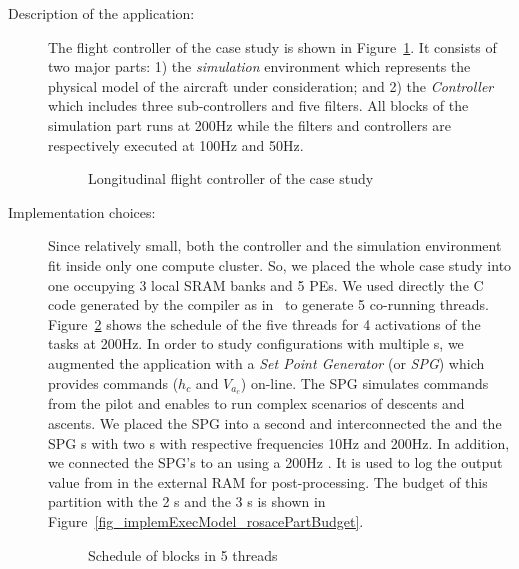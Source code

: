 \documentclass[main.tex]{subfiles}
\begin{document}
\begin{description}
    \item[Description of the application: ]
        The flight controller of the \rosace case study is shown in Figure~\ref{fig_implemExecModel_rosace}. It consists of two major parts: 1) the \emph{simulation} environment which represents the physical model of the aircraft under consideration; and 2) the \emph{Controller} which includes three sub-controllers and five filters. All blocks of the simulation part runs at 200Hz while the filters and controllers are respectively executed at 100Hz and 50Hz. 

            \begin{figure}
                \centering
                \scalebox{1.5}{}
                \caption{Longitudinal flight controller of the \rosace case study}
                \label{fig_implemExecModel_rosace}
            \end{figure}

        \item[Implementation choices: ] Since relatively small, both the \rosace controller and the simulation environment fit inside only one compute cluster. So, we placed the whole \rosace case study into one \PN{} occupying 3 local SRAM banks and 5 PEs. We used directly the C code generated by the \prelude compiler as in~\cite{Pagetti2014} to generate 5 co-running threads. Figure~\ref{fig_implemExecModel_schedulRosace} shows the schedule of the five threads for 4 activations of the \rosace tasks at 200Hz. In order to study configurations with multiple \PN{}s, we augmented the \rosace application with a \emph{Set Point Generator} (or \emph{SPG}) which provides commands ($h_c$ and $V_{a_c}$) on-line. The SPG simulates commands from the pilot and enables to run complex scenarios of descents and ascents. We placed the SPG into a second \PN{} and interconnected the \rosace and the SPG \PN{}s with two \PC{}s with respective frequencies 10Hz and 200Hz. In addition, we connected the SPG's \PN{} to an \ION{} using a 200Hz \PC{}. It is used to log the output value from \rosace in the external RAM for post-processing. The budget of this partition with the 2 \PN{}s and the 3 \PC{}s is shown in Figure~\ref{fig_implemExecModel_rosacePartBudget}. 


            \begin{figure}
                \centering
                
                \caption{Schedule of \rosace blocks in 5 threads}
                \label{fig_implemExecModel_schedulRosace}
            \end{figure}



\end{description}
\end{document}
